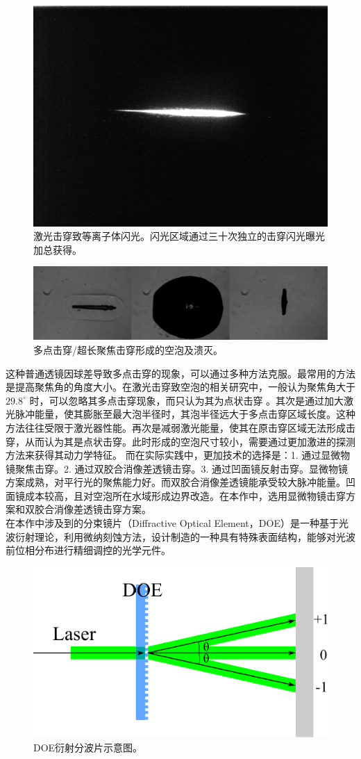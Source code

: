\begin{figure}[h]
\centering
\includegraphics[width=0.5\linewidth]{img/fig2.3-eps-converted-to.pdf}
\centering
\caption[激光击穿致等离子体闪光]{激光击穿致等离子体闪光。闪光区域通过三十次独立的击穿闪光曝光加总获得。}
\label{fig2.3}
\end{figure}



\begin{figure}[h]
\centering
\includegraphics[width=0.7\linewidth]{img/fig2.4-eps-converted-to.pdf}
\centering
\caption[多点击穿/超长聚焦击穿形成的空泡及溃灭]{多点击穿/超长聚焦击穿形成的空泡及溃灭。}
\label{fig2.4}
\end{figure}


这种普通透镜因球差导致多点击穿的现象，可以通过多种方法克服。最常用的方法是提高聚焦角的角度大小。在激光击穿致空泡的相关研究中，一般认为聚焦角大于
$29.8^{\circ}$ 时，可以忽略其多点击穿现象，而只认为其为点状击穿
\cite{fu_experimental_2018}。其次是通过加大激光脉冲能量，使其膨胀至最大泡半径时，其泡半径远大于多点击穿区域长度。这种方法往往受限于激光器性能。再次是减弱激光能量，使其在原击穿区域无法形成击穿，从而认为其是点状击穿。此时形成的空泡尺寸较小，需要通过更加激进的探测方法来获得其动力学特征。
而在实际实践中，更加技术的选择是：1. 通过显微物镜聚焦击穿。2.
通过双胶合消像差透镜击穿。3.
通过凹面镜反射击穿。显微物镜方案成熟，对平行光的聚焦能力好。而双胶合消像差透镜能承受较大脉冲能量。凹面镜成本较高，且对空泡所在水域形成边界改造。在本作中，选用显微物镜击穿方案和双胶合消像差透镜击穿方案。\\
在本作中涉及到的分束镜片（Diffractive Optical
Element，DOE）是一种基于光波衍射理论，利用微纳刻蚀方法，设计制造的一种具有特殊表面结构，能够对光波前位相分布进行精细调控的光学元件。

\begin{figure}[h]
\centering
\includegraphics[width=0.5\linewidth]{img/fig2.5-eps-converted-to.pdf}
\centering
\caption[DOE
衍射分波片示意图]{DOE衍射分波片示意图。}
\label{fig2.5}
\end{figure}



